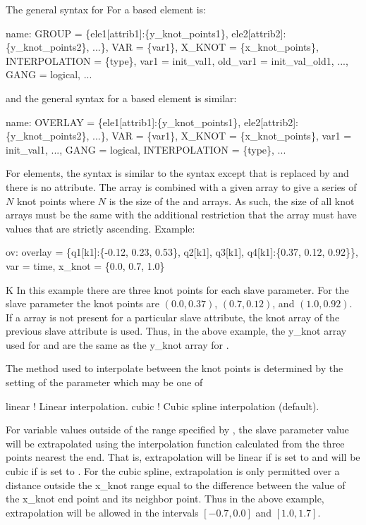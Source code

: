 The general syntax for For a  based  element is:
\begin{example}
  name: GROUP = \{ele1[attrib1]:\{y_knot_points1\}, ele2[attrib2]:\{y_knot_points2\}, ...\}, 
              VAR = \{var1\}, X_KNOT = \{x_knot_points\}, INTERPOLATION = \{type\},
              var1 = init_val1, old_var1 = init_val_old1, ..., GANG = logical, ... 
\end{example}
and the general syntax for a  based  element is similar:
\begin{example}
  name: OVERLAY = \{ele1[attrib1]:\{y_knot_points1\}, ele2[attrib2]:\{y_knot_points2\}, ...\}, 
        VAR = \{var1\}, X_KNOT = \{x_knot_points\}, var1 = init_val1, ..., 
        GANG = logical, INTERPOLATION = \{type\}, ...
\end{example}
For  elements, the syntax is similar to the  syntax except that 
is replaced by  and there is no  attribute. The  array is combined
with a given  array to give a series of $N$ knot points where $N$ is the size of the
 and  arrays. As such, the size of all knot arrays must be the same with the
additional restriction that the  array must have values that are strictly ascending.
Example:
\begin{example}
  ov: overlay = \{q1[k1]:\{-0.12, 0.23, 0.53\}, q2[k1], q3[k1], q4[k1]:\{0.37, 0.12, 0.92\}\}, 
        var = {time}, x_knot = \{0.0, 0.7, 1.0\}
\end{example}K
In this example there are three knot points for each slave parameter. For the slave parameter
 the knot points are $(0.0, 0.37)$, $(0.7, 0.12)$, and $(1.0, 0.92)$.  If a
 array is not present for a particular slave attribute, the knot array of the
previous slave attribute is used. Thus, in the above example, the y_knot array used for 
and  are the same as the y_knot array for .

The method used to interpolate between the knot points is determined by the setting of the
 parameter which may be one of
\begin{example}
  linear      ! Linear interpolation.
  cubic       ! Cubic spline interpolation (default).
\end{example}
For variable values outside of the range specified by , the slave parameter value will be
extrapolated using the interpolation function calculated from the three points nearest the end. That
is, extrapolation will be linear if  is set to  and will be cubic if
 is set to . For the cubic spline, extrapolation is only permitted over a
distance outside the x_knot range equal to the difference between the value of the x_knot end point
and its neighbor point. Thus in the above example, extrapolation will be allowed in the intervals
$[-0.7, 0.0]$ and $[1.0, 1.7]$.

